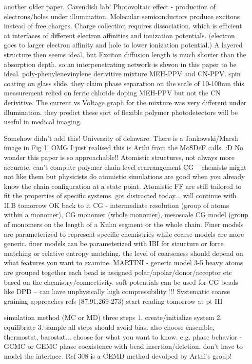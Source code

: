 \documentclass{article}
\begin{document}
\cite{Halls1995}
another older paper. Cavendish lab! Photovoltaic effect - production of electrons/holes under illumination. Molecular semiconductors produce excitons instead of free charges. Charge collection requires dissociation, which is efficient at interfaces of different electron affinities and ionization potentials. (electron goes to larger electron affinity and hole to lower ionization potential.) A layered structure then seems ideal, but Exciton diffusion length is much shorter than the absorption depth. so an interpenetrating network is shwon in this paper to be ideal.
poly-phenylenevinylene derivitive mixture MEH-PPV and CN-PPV. spin coating on glass slide. they claim phase separation on the scale of 10-100nm this measurement relied on ferric chloride doping MEH-PPV but not the CN derivitive.
The current vs Voltage graph for the mixture was very different under illumination.
they predict these sort of flexible polymer photodetectors will be useful in medical imaging.

\cite{Gartner2019a}
Somehow didn't add this!
University of delaware. There is a Jankowski/Marsh image in Fig 1!
OMG I just realised this is Arthi from the MoSDeF calls. :D No wonder this paper is so approachable!! 
Atomistic structures, not always more accurate, can't compute polymer chain level rearrangement
CG -- chemists might not like them but physicists do
atomistic simulations are good when you already know the chain configuration at a state point. Atomistic FF are still tailored to fit the properties of specific systems. got distracted today... will continue with II.B tomorrow
OK back to it
CG - intermediate resolution (group of atoms within a monomer), CG monomer (whole monomer), mesoscale CG model (group of monomers on the length of a Kuhn segment or the whole chain.
Finer models are parameterized to represent specific chemistries while coarse models are more generic. finer models can be parameterized with IBI for structure or force matching or relative entropy matching. the level of coarseness should depend on what features you want to examine.
MARTINI - generic model 3-5 heavy atoms are grouped together each bead is assigned polar/apolar/donor/acceptor etc based on the chemistry/connectivity.
soft potentials can be used for CG beads like DPD -- can have unphysically high compressibility
!!! Systematic coarse graining approaches refs (87,91,269-273)
start reading tomorrow at pt III

simulation method (MC or MD) three steps
1. create/initialize system
2. equilibrate
3. sample
all steps should avoid bias.
also choose ensemble, thermostat, barostat... choose for what you want to know. e.g. phase behavior - GCMC or GEMC phase coexistence with bead insertion/deletion. don't have to model the interface. Ref 308 is a GEMD method devolped by Arthi's group!
\end{document}
